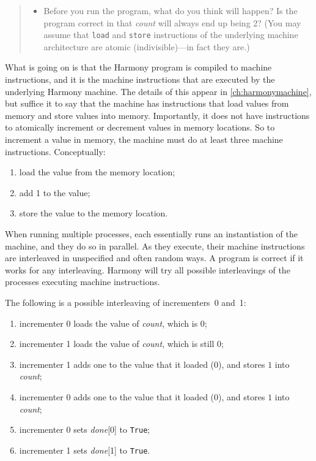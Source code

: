 \documentclass{report}
\begin{document}
\begin{quote}
\begin{itemize}
\item Before you run the program, what do you think will happen?  Is the
program correct in that \textit{count} will always end up being 2?
(You may assume that \texttt{load} and \texttt{store} instructions of the
underlying machine architecture are atomic (indivisible)---in fact they are.)
\end{itemize}
\end{quote}

%

What is going on is that the Harmony program is compiled to machine instructions,
%
and it is the machine instructions that are executed by the underlying Harmony
machine.  The details of this appear in \autoref{ch:harmonymachine},
but suffice it to
say that the machine has instructions that load values from memory and store
values into memory.  Importantly, it does not have instructions to atomically
increment or decrement values in memory locations.
So to increment a value in memory,
the machine must do at least three machine instructions.  Conceptually:
\begin{enumerate}
\item load the value from the memory location;
\item add 1 to the value;
\item store the value to the memory location.
\end{enumerate}

When running multiple processes, each essentially runs an instantiation of
the machine, and they do so in parallel.  As they execute, their machine
instructions are interleaved
%
in unspecified and often random ways.
A program is correct if it works for any interleaving.
Harmony will try all possible interleavings of the processes
executing machine instructions.

The following is a possible interleaving of incrementers~0 and~1:
\begin{enumerate}
\item incrementer 0 loads the value of \textit{count}, which is 0;
\item incrementer 1 loads the value of \textit{count}, which is still 0;
\item incrementer 1 adds one to the value that it loaded (0), and
stores $1$ into \textit{count};
\item incrementer 0 adds one to the value that it loaded (0), and
stores $1$ into \textit{count};
\item incrementer 0 sets \textit{done}[0] to \texttt{True};
\item incrementer 1 sets \textit{done}[1] to \texttt{True}.
\end{enumerate}
\end{document}
